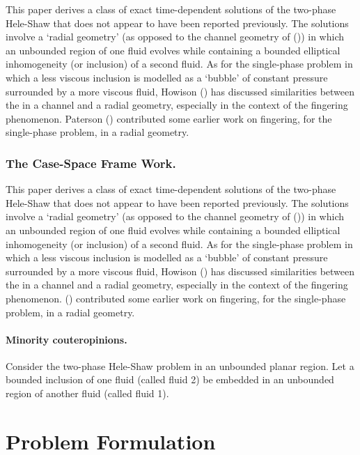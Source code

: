 \documentclass{article}
\begin{document}
This paper derives a class of exact time-dependent solutions of the two-phase Hele-Shaw  that does not appear to have been reported previously.
The solutions involve a `radial geometry' (as opposed
to the channel geometry of (\citealt{JS})) in which 
an unbounded region of one fluid evolves 
while containing a bounded elliptical inhomogeneity
(or inclusion) of a second fluid.
As for the single-phase problem in which a
less viscous inclusion is modelled as a `bubble' of constant
pressure surrounded by a 
more viscous fluid, Howison (\citealt{How10}) has discussed similarities
between the  in a channel and a radial 
geometry, especially in the context of the fingering
phenomenon. Paterson (\citealt{Pat}) contributed some earlier work
on fingering, for the single-phase problem, in a radial geometry.

\subsubsection{The Case-Space Frame Work.}

This paper derives a class of exact time-\break dependent solutions of the two-phase Hele-Shaw  that does not appear to have been reported previously.
The solutions involve a `radial geometry' (as opposed
to the channel geometry of (\citealt{JS})) in which 
an unbounded region of one fluid evolves 
while containing a bounded elliptical inhomogeneity
(or inclusion) of a second fluid.
As for the single-phase problem in which a
less viscous inclusion is modelled as a `bubble' of constant
pressure surrounded by a 
more viscous fluid, Howison (\citealt{How10}) has discussed similarities
between the  in a channel and a radial 
geometry, especially in the context of the fingering
phenomenon. (\citealt{Pat}) contributed some earlier work
on fingering, for the single-phase problem, in a radial geometry.

\paragraph{Minority couteropinions.}

Consider the two-phase Hele-Shaw problem in an unbounded
planar region. Let a bounded inclusion of one fluid 
(called fluid 2) be embedded in an unbounded region of
another fluid (called fluid 1).

\section{Problem Formulation}
\end{document}
